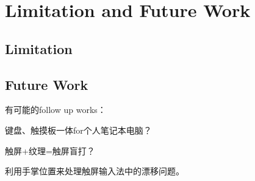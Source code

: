 \section{Limitation and Future Work}

\subsection{Limitation}

\subsection{Future Work}

有可能的follow up works：

键盘、触摸板一体for个人笔记本电脑？

触屏+纹理=触屏盲打？

利用手掌位置来处理触屏输入法中的漂移问题。
